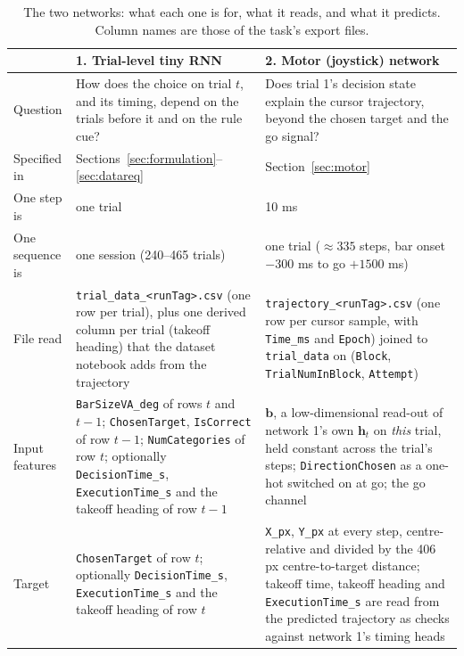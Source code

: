 \documentclass[11pt,a4paper]{article}
\newcommand{\vect}[1]{\bm{#1}}
\begin{document}
\begin{table}[H]
  \centering\footnotesize
  \caption{The two networks: what each one is for, what it reads, and what it predicts.
  Column names are those of the task's export files.}
  \label{tab:three}
  \begin{tabular}{L{2.6cm}L{6.3cm}L{6.3cm}}
    \toprule
    & \textbf{1. Trial-level tiny RNN} & \textbf{2. Motor (joystick) network} \\
    \midrule
    Question &
      How does the choice on trial $t$, and its timing, depend on the trials before it and on the rule cue? &
      Does trial 1's decision state explain the cursor trajectory, beyond the chosen target and the go signal? \\
    \addlinespace
    Specified in & Sections~\ref{sec:formulation}--\ref{sec:datareq} & Section~\ref{sec:motor} \\
    \addlinespace
    One step is & one trial & 10 ms \\
    One sequence is & one session (240--465 trials) & one trial ($\approx 335$ steps, bar onset $-300$ ms to go $+1500$ ms) \\
    \addlinespace
    File read &
      \texttt{trial\_data\_<runTag>.csv} (one row per trial), plus one derived column per trial (takeoff heading) that the dataset notebook adds from the trajectory &
      \texttt{trajectory\_<runTag>.csv} (one row per cursor sample, with \texttt{Time\_ms} and \texttt{Epoch}) joined to \texttt{trial\_data} on (\texttt{Block}, \texttt{TrialNumInBlock}, \texttt{Attempt}) \\
    \addlinespace
    Input features &
      \texttt{BarSizeVA\_deg} of rows $t$ and $t-1$; \texttt{ChosenTarget}, \texttt{IsCorrect} of row $t-1$; \texttt{NumCategories} of row $t$; optionally \texttt{DecisionTime\_s}, \texttt{ExecutionTime\_s} and the takeoff heading of row $t-1$ &
      $\vect{b}$, a low-dimensional read-out of network 1's own $\vect{h}_t$ on \emph{this} trial, held constant across the trial's steps; \texttt{DirectionChosen} as a one-hot switched on at go; the go channel \\
    \addlinespace
    Target &
      \texttt{ChosenTarget} of row $t$; optionally \texttt{DecisionTime\_s}, \texttt{ExecutionTime\_s} and the takeoff heading of row $t$ &
      \texttt{X\_px}, \texttt{Y\_px} at every step, centre-relative and divided by the 406 px centre-to-target distance; takeoff time, takeoff heading and \texttt{ExecutionTime\_s} are read from the predicted trajectory as checks against network 1's timing heads \\

\end{tabular}
\end{table}
\end{document}
